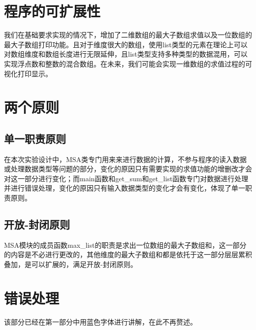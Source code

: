 \documentclass{article}
\begin{document}
\section{程序的可扩展性}
我们在基础要求实现的情况下，增加了二维数组的最大子数组求值以及一位数组的最大子数组打印功能。且对于维度很大的数组，使用list类型的元素在理论上可以对数组维度和数组长度进行无限延伸，且list类型支持多种类型的数据混用，可以实现浮点数和整数的混合数组。在未来，我们可能会实现一维数组的求值过程的可视化打印显示。
\section{两个原则}
\subsection{单一职责原则}
在本次实验设计中，MSA类专门用来来进行数据的计算，不参与程序的读入数据或处理数据类型等问题的部分，变化的原因只有需要实现的求值功能的增删改才会对这一部分进行变化；而main函数和get\_sum和get\_list函数专门对数据进行处理并进行错误处理，变化的原因只有输入数据类型的变化才会有变化，体现了单一职责原则。
\subsection{开放-封闭原则}
MSA模块的成员函数max\_list的职责是求出一位数组的最大子数组和，这一部分的内容是不必进行更改的，其他维度的最大子数组和都是依托于这一部分层层累积叠加，是可以扩展的，满足开放-封闭原则。
\section{错误处理}
该部分已经在第一部分中用\textcolor[rgb]{0,0.8,1}{蓝色字体}进行讲解，在此不再赘述。
\end{document}
